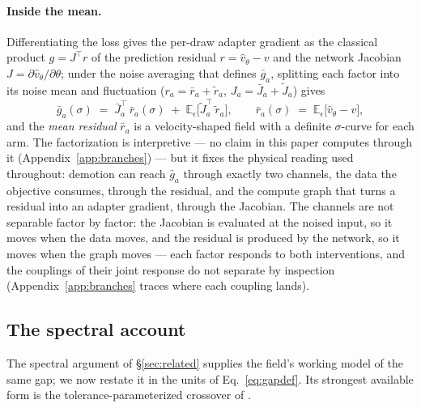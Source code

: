 \paragraph{Inside the mean.}
Differentiating the loss gives the per-draw adapter gradient as the
classical product $g = J^{\!\top} r$ of the prediction residual
$r = \hat v_\theta - v$ and the network Jacobian
$J = \partial \hat v_\theta / \partial \theta$; under the noise
averaging that defines $\bar g_a$, splitting each factor into its
noise mean and fluctuation ($r_a = \bar r_a + \tilde r_a$,
$J_a = \bar J_a + \tilde J_a$) gives
\begin{equation*}
\bar g_a(\sigma)
\;=\; \bar J_a^{\!\top}\,\bar r_a(\sigma)
\;+\; \mathbb{E}_\epsilon\!\big[\tilde J_a^{\!\top}\,\tilde r_a\big],
\qquad
\bar r_a(\sigma) \;=\; \mathbb{E}_\epsilon\big[\hat v_\theta - v\big],
\end{equation*}
and the \emph{mean residual} $\bar r_a$ is a velocity-shaped field
with a definite $\sigma$-curve for each arm. The factorization is
interpretive --- no claim in this paper computes through it
(Appendix~\ref{app:branches}) --- but it fixes the physical reading
used throughout: demotion can reach $\bar g_a$ through exactly two
channels, the data the objective consumes, through the residual, and
the compute graph that turns a residual into an adapter gradient,
through the Jacobian. The channels are not separable factor by
factor: the Jacobian is evaluated at the noised input, so it moves
when the data moves, and the residual is produced by the network, so
it moves when the graph moves --- each factor responds to both
interventions, and the couplings of their joint response do not
separate by inspection (Appendix~\ref{app:branches} traces where
each coupling lands).

\subsection{The spectral account}
\label{sec:spectral}

The spectral argument of \S\ref{sec:related} supplies the field's
working model of the same gap; we now restate it in the units of
Eq.~\ref{eq:gapdef}. Its strongest available form is the
tolerance-parameterized crossover of \citet{xiao2026spd}.

